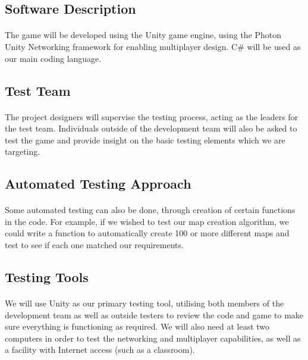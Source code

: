 \documentclass[12pt, titlepage]{article}
\begin{document}
\subsection{Software Description}
\paragraph{}The game will be developed using the Unity game engine, using the Photon Unity Networking framework for enabling multiplayer design. C\# will be used as our main coding language.
\subsection{Test Team}
\paragraph{}The project designers will supervise the testing process, acting as the leaders for the test team. Individuals outside of the development team will also be asked to test the game and provide insight on the basic testing elements which we are targeting. 
\subsection{Automated Testing Approach}
\paragraph{}Some automated testing can also be done, through creation of certain functions in the code. For example, if we wished to test our map creation algorithm, we could write a function to automatically create 100 or more different maps and test to see if each one matched our requirements. 
\subsection{Testing Tools}
\paragraph{}We will use Unity as our primary testing tool, utilising both members of the development team as well as outside testers to review the code and game to make sure everything is functioning as required. We will also need at least two computers  in order to test the networking and multiplayer capabilities, as well as a facility with Internet access (such as a classroom).
\end{document}
